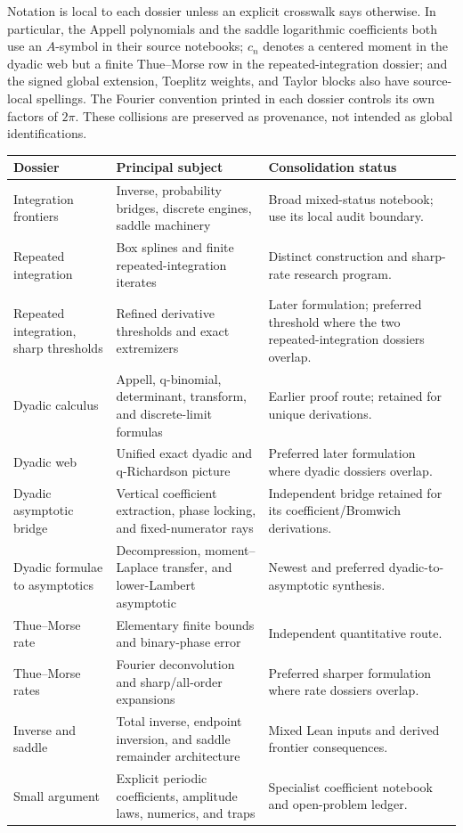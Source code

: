 \documentclass[11pt,oneside]{article}
\theoremstyle{definition}
\theoremstyle{remark}
\begin{document}
Notation is local to each dossier unless an explicit crosswalk says otherwise.  In
particular, the Appell polynomials and the saddle logarithmic coefficients both use an
\(A\)-symbol in their source notebooks; \(c_n\) denotes a centered moment in the dyadic
web but a finite Thue--Morse row in the repeated-integration dossier; and the signed global
extension, Toeplitz weights, and Taylor blocks also have source-local spellings.  The
Fourier convention printed in each dossier controls its own factors of \(2\pi\).  These
collisions are preserved as provenance, not intended as global identifications.

\begin{longtable}{@{}p{}p{}p{}@{}}
\toprule
Dossier & Principal subject & Consolidation status \\
\midrule
\endhead
Integration frontiers & Inverse, probability bridges, discrete engines, saddle machinery & Broad mixed-status notebook; use its local audit boundary. \\
Repeated integration & Box splines and finite repeated-integration iterates & Distinct construction and sharp-rate research program. \\
Repeated integration, sharp thresholds & Refined derivative thresholds and exact extremizers & Later formulation; preferred threshold where the two repeated-integration dossiers overlap. \\
Dyadic calculus & Appell, q-binomial, determinant, transform, and discrete-limit formulas & Earlier proof route; retained for unique derivations. \\
Dyadic web & Unified exact dyadic and q-Richardson picture & Preferred later formulation where dyadic dossiers overlap. \\
Dyadic asymptotic bridge & Vertical coefficient extraction, phase locking, and fixed-numerator rays & Independent bridge retained for its coefficient/Bromwich derivations. \\
Dyadic formulae to asymptotics & Decompression, moment--Laplace transfer, and lower-Lambert asymptotic & Newest and preferred dyadic-to-asymptotic synthesis. \\
Thue--Morse rate & Elementary finite bounds and binary-phase error & Independent quantitative route. \\
Thue--Morse rates & Fourier deconvolution and sharp/all-order expansions & Preferred sharper formulation where rate dossiers overlap. \\
Inverse and saddle & Total inverse, endpoint inversion, and saddle remainder architecture & Mixed Lean inputs and derived frontier consequences. \\
Small argument & Explicit periodic coefficients, amplitude laws, numerics, and traps & Specialist coefficient notebook and open-problem ledger. \\
\bottomrule
\end{longtable}
\end{document}
